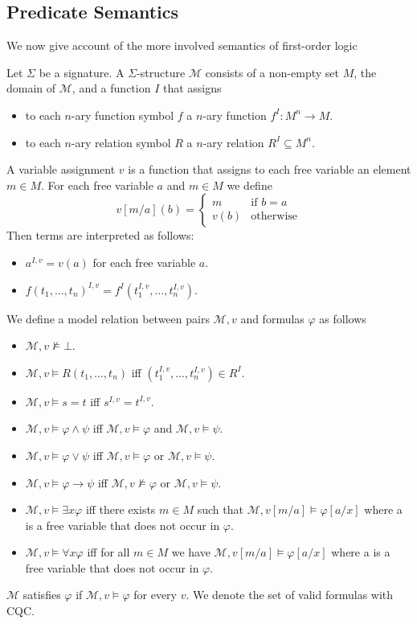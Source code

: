 \documentclass[a4paper,UKenglish,cleveref, autoref, thm-restate]{lipics-v2021}
\begin{document}
\subsection{Predicate Semantics}

We now give account of the more involved semantics of first-order logic

\begin{definition}
	Let $\Sigma$ be a signature. A $\Sigma$-structure $\mathcal{M}$ consists of a non-empty set $M$, the domain of $\mathcal{M}$, and a function $I$ that assigns
	\begin{itemize}
		\item to each $n$-ary function symbol $f$ a $n$-ary function $f^I: M^n\to M$.
		\item to each $n$-ary relation symbol $R$ a $n$-ary relation $R^I\subseteq M^n$.
	\end{itemize}
	A variable assignment $v$ is a function that assigns to each free variable an element $m\in M$. For each free variable $a$ and $m\in M$ we define $$v[m/a](b) = \begin{cases}
		m&\text{if $b=a$}\\
		v(b)&\text{otherwise}
	\end{cases}$$
	Then terms are interpreted as follows:
	\begin{itemize}
		\item $a^{I, v} = v(a)$ for each free variable $a$.
		\item $f(t_1,\dots,t_n)^{I, v} = f^I(t_1^{I, v},\dots, t_n^{I, v})$.
	\end{itemize}
	We define a model relation between pairs $\mathcal M, v$ and formulas $\varphi$ as follows
	\begin{itemize}
		\item $\mathcal M, v\not\models\bot$.
		\item $\mathcal M, v\models R(t_1,\dots,t_n)$ iff $(t_1^{I, v},\dots,t_n^{I, v})\in R^I$.
		\item $\mathcal M, v\models s = t$ iff $s^{I, v} = t^{I, v}$.
		\item $\mathcal M, v\models \varphi\wedge \psi$ iff $\mathcal M, v\models\varphi$ and $\mathcal M, v\models\psi$.
		\item $\mathcal M, v\models \varphi\vee\psi$ iff $\mathcal M, v\models\varphi$ or $\mathcal M, v\models\psi$.
		\item $\mathcal M, v\models \varphi\to\psi$ iff $\mathcal M, v\not\models\varphi$ or $\mathcal M, v\models\psi$.
		\item $\mathcal M, v\models\exists x\varphi$ iff there exists $m\in M$ such that $\mathcal M, v[m/a]\models\varphi[a/x]$ where a is a free variable that does not occur in $\varphi$.
		\item $\mathcal M, v\models\forall x\varphi$ iff for all $m\in M$ we have $\mathcal M, v[m/a]\models\varphi[a/x]$ where a is a free variable that does not occur in $\varphi$.
	\end{itemize}
	$\mathcal{M}$ satisfies $\varphi$ if $\mathcal M, v\models\varphi$ for every $v$. We denote the set of valid formulas with CQC.
\end{definition}
\end{document}
